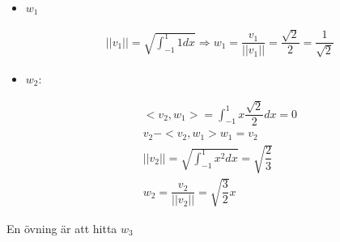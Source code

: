 \begin{itemize}
  \item$w_1$\par
    \begin{equation*}
      \begin{gathered}
        \left|\left|v_1\right|\right| = \sqrt{\int_{-1}^{1}1dx}\Rightarrow w_1 = \dfrac{v_1}{\left|\left|v_1\right|\right|} = \dfrac{\sqrt{2}}{2} = \dfrac{1}{\sqrt{2}}
      \end{gathered}
    \end{equation*}
    \par\bigskip
  \item$w_2$:\par
    \begin{equation*}
      \begin{gathered}
        <v_2,w_1> = \int_{-1}^{1}x\dfrac{\sqrt{2}}{2}dx = 0\\
        v_2-<v_2,w_1>w_1 = v_2\\
        \left|\left|v_2\right|\right| = \sqrt{\int_{-1}^{1}x^2dx} = \sqrt{\dfrac{2}{3}}\\
        w_2 = \dfrac{v_2}{\left|\left|v_2\right|\right|} = \sqrt{\dfrac{3}{2}}x
      \end{gathered}
    \end{equation*}
\end{itemize}
\par\bigskip
\noindent En övning är att hitta $w_3$
